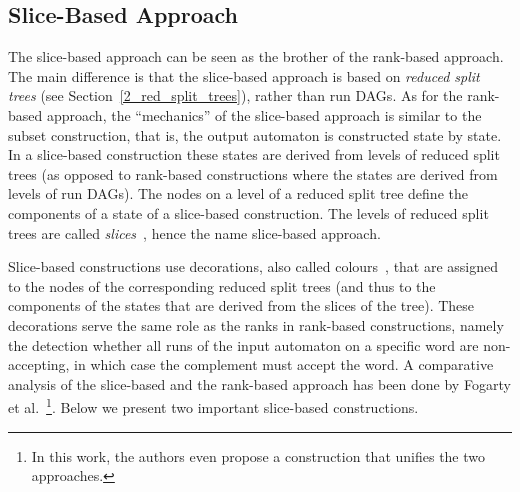 

\subsection{Slice-Based Approach}
\label{2_slice-based}
The slice-based approach can be seen as the brother of the rank-based approach. The main difference is that the slice-based approach is based on \textit{reduced split trees} (see Section~\ref{2_red_split_trees}), rather than run DAGs. As for the rank-based approach, the ``mechanics'' of the slice-based approach is similar to the subset construction, that is, the output automaton is constructed state by state. In a slice-based construction these states are derived from levels of reduced split trees (as opposed to rank-based constructions where the states are derived from levels of run DAGs). The nodes on a level of a reduced split tree define the components of a state of a slice-based construction. The levels of reduced split trees are called \textit{slices}~\cite{vardi2007automata}, hence the name slice-based approach.

Slice-based constructions use decorations, also called colours~\cite{2014_joel_ulrich}, that are assigned to the nodes of the corresponding reduced split trees (and thus to the components of the states that are derived from the slices of the tree). These decorations serve the same role as the ranks in rank-based constructions, namely the detection whether all runs of the input automaton on a specific word are non-accepting, in  which case the complement must accept the word. A comparative analysis of the slice-based and the rank-based approach has been done by Fogarty et al.~\cite{fogarty2013unifying}\footnote{In this work, the authors even propose a construction that unifies the two approaches.}. Below we present two important slice-based constructions. 

